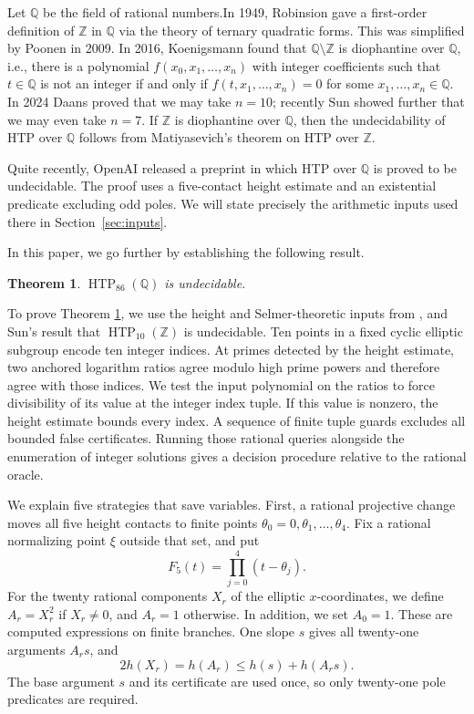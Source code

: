 \documentclass[11pt,reqno]{amsart}
\newtheorem{theorem}{Theorem}[section]
\theoremstyle{definition}
\numberwithin{equation}{section}
\newcommand{\Q}{\mathbb Q}
\newcommand{\Z}{\mathbb Z}
\newcommand{\HTP}{\operatorname{HTP}}
\def\sm{\setminus}
\begin{document}
Let $\mathbb Q$ be the field of rational numbers.In 1949, Robinsion \cite{Rob} gave a 
first-order definition of $\Z$ in $\Q$ via the theory of ternary quadratic forms.
This was simplified by Poonen  \cite{Poonen} in 2009.
In 2016, Koenigsmann \cite{Koen} found that $\Q\sm \Z$ is diophantine over $\Q$, i.e.,
there is a polynomial $f(x_0,x_1,\ldots,x_n)$ with integer coefficients such that  $t\in\Q$ is not an integer if and only if $f(t,x_1,\ldots,x_n)=0$ for some $x_1,\ldots,x_n\in\Q$.
In 2024 Daans \cite{Daans} proved that we may take $n=10$; recently Sun \cite{Sun7}
showed further that we may even take $n=7$. If $\Z$ is diophantine over $\Q$, then
the undecidability of  HTP over $\Q$ follows from Matiyasevich's theorem on HTP over $\Z$.

Quite recently, OpenAI released a preprint \cite{OAI} in which HTP over $\Q$ is proved to be undecidable. The proof uses a five-contact height estimate and an existential predicate excluding odd poles.  We will state precisely the arithmetic inputs used there in Section~\ref{sec:inputs}.

In this paper, we go further by establishing the following result.

\begin{theorem}\label{thm:main} $\HTP_{86}(\Q)$ is undecidable.
\end{theorem}

To prove Theorem \ref{thm:main}, we use the height and Selmer-theoretic inputs from \cite{OAI}, and Sun's result \cite{Sun10} that $\HTP_{10}(\Z)$
is undecidable. 
Ten points in a fixed cyclic elliptic subgroup encode ten integer indices. At primes detected by the height estimate, two anchored logarithm ratios agree modulo high prime powers and therefore agree with those indices. We test the input polynomial on the ratios to force divisibility of its value at the integer index tuple. If this value is nonzero, the height estimate bounds every index. A sequence of finite tuple guards excludes all bounded false certificates. Running those rational queries alongside the enumeration of integer solutions gives a decision procedure relative to the rational oracle.

We explain five strategies that save variables. First, a rational projective change moves all five height contacts to finite points $\theta_0=0,\theta_1,\ldots,\theta_4$. Fix a rational normalizing point $\xi$ outside that set, and put
\begin{equation}\label{eq:introdetector}
 F_5(t)=\prod_{j=0}^4(t-\theta_j).
\end{equation}
For the twenty rational components $X_r$ of the elliptic $x$-coordinates, we define $A_r=X_r^2$ if $X_r\ne0$, and $A_r=1$ otherwise. In addition, we set $A_0=1$. These are computed expressions on finite branches. One slope $s$ gives all twenty-one arguments $A_rs$, and
\[
 2h(X_r)=h(A_r)\le h(s)+h(A_rs).
\]
The base argument $s$ and its certificate are used once, so only twenty-one pole predicates are required.
\end{document}
